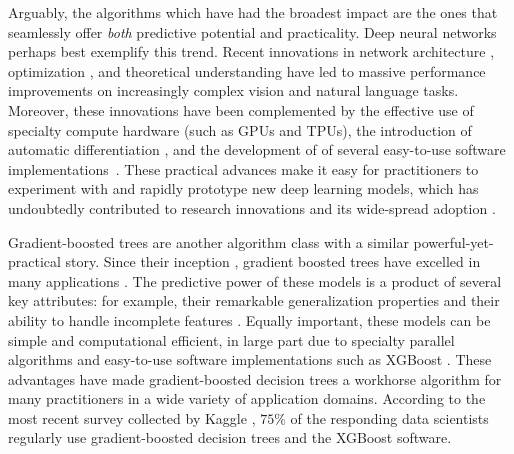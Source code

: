 Arguably, the algorithms which have had the broadest impact are the ones that seamlessly offer \emph{both} predictive potential and practicality.
Deep neural networks perhaps best exemplify this trend.
Recent innovations in
network architecture \citep[e.g.][]{krizhevsky2012imagenet,he2016deep,vaswani2017attention,devlin2018bert,huang2019convolutional},
optimization \citep[e.g.][]{hochreiter1997flat,bottou2010large,ioffe2015batch,izmailov2018averaging},
and theoretical understanding \citep[e.g.][]{keskar2016large,zhang2016understanding,}
have led to massive performance improvements on increasingly complex vision and natural language tasks.
Moreover, these innovations have been complemented by
the effective use of specialty compute hardware (such as GPUs and TPUs),
the introduction of automatic differentiation \citep[e.g.][]{paszke2017automatic},
and the development of of several easy-to-use software implementations~\citep[e.g.][]{jia2014caffe,chen2015mxnet,abadi2016tensorflow,paszke2019pytorch}.
These practical advances make it easy for practitioners to experiment with and rapidly prototype new deep learning models, which has undoubtedly contributed to research innovations and its wide-spread adoption \cite{goodfellow2016deep}.

Gradient-boosted trees are another algorithm class with a similar powerful-yet-practical story.
Since their inception \cite{friedman2001greedy,friedman2002stochastic}, gradient boosted trees have excelled in many applications \citep[e.g.][]{richardson2007predicting,burges2010ranknet,li2010robust}.
The predictive power of these models is a product of several key attributes: for example, their remarkable generalization properties \citep{freund1997decision,schapire2013boosting} and their ability to handle incomplete features \cite{friedman2001greedy}.
Equally important, these models can be simple and computational efficient, in large part due to specialty parallel algorithms \citep[e.g.][]{panda2009planet,tyree2011parallel,ke2017lightgbm} and easy-to-use software implementations such as XGBoost \cite{chen2016xgboost}.
These advantages have made gradient-boosted decision trees a workhorse algorithm for many practitioners in a wide variety of application domains.
According to the most recent survey collected by Kaggle \cite{kaggle2019kaggle}, $75\%$ of the responding data scientists regularly use gradient-boosted decision trees and the XGBoost software.

